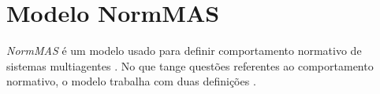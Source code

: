 \section{Modelo NormMAS}
\textit{NormMAS} é um modelo usado para definir comportamento normativo de sistemas multiagentes \cite{normas}. No que tange questões referentes ao comportamento normativo, o modelo trabalha com duas definições \cite{normas}.
